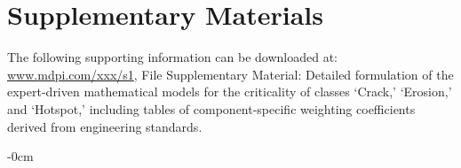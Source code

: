 \documentclass[energies,article,submit,pdftex,moreauthors]{Definitions/mdpi}
\begin{document}
\section*{Supplementary Materials}
The following supporting information can be downloaded at: \href{http://www.mdpi.com/xxx/s1}{www.mdpi.com/xxx/s1}, File Supplementary Material: Detailed formulation of the expert-driven mathematical models for the criticality of classes `Crack,' `Erosion,' and `Hotspot,' including tables of component-specific weighting coefficients derived from engineering standards.

\begin{adjustwidth}{-\extralength}{0cm}




\PublishersNote{}

\end{adjustwidth}
\end{document}
